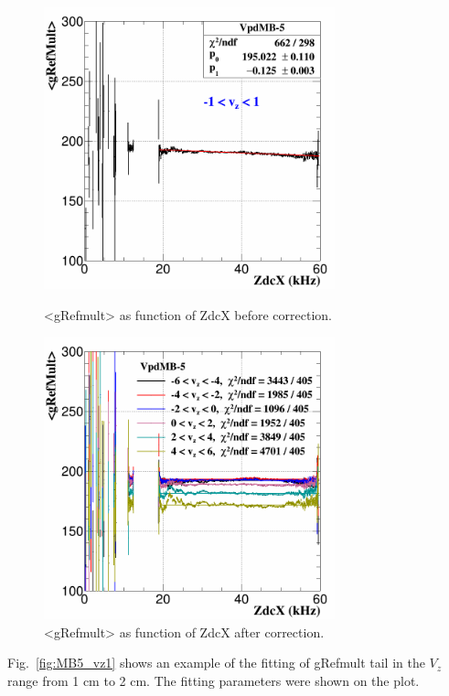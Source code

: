\begin{figure}[htbp]
\begin{minipage}[htbp]{0.52\linewidth}
\centering
\includegraphics[width=0.75\textwidth]{figure/Run14_D0HFT/MB5_ZDCcor1.png}
\caption{<gRefmult> as function of ZdcX before correction.\label{fig:MB5_zdc1}}
\end{minipage}
\hfill
\begin{minipage}[htbp]{0.52\linewidth}
\centering
\includegraphics[width=0.75\textwidth]{figure/Run14_D0HFT/MB5_ZDCcor2.png} 
\caption{<gRefmult> as function of ZdcX after correction.\label{fig:MB5_zdc2}}
\end{minipage}
\end{figure}

Fig.~\ref{fig:MB5_vz1} shows an example of the fitting of gRefmult tail in the $V_{z}$ range from 1 cm to 2 cm. The fitting parameters were shown on the plot.

